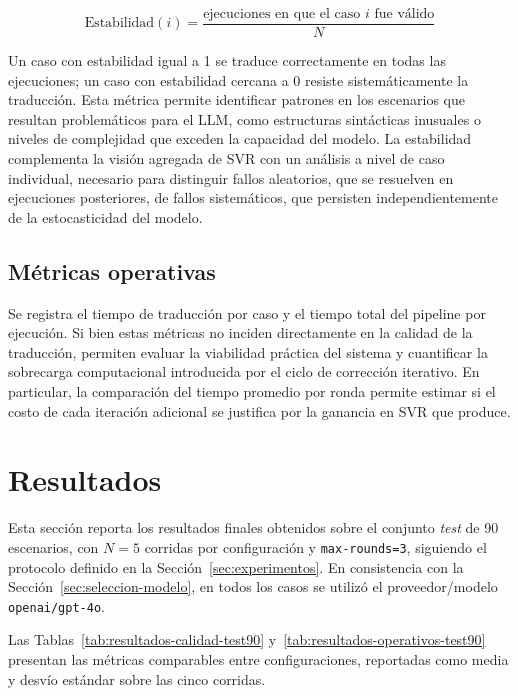 \begin{equation}
  \text{Estabilidad}(i) = \frac{\text{ejecuciones en que el caso } i \text{ fue válido}}{N}
\label{eq:estabilidad}
\end{equation}

Un caso con estabilidad igual a 1 se traduce correctamente en todas las ejecuciones; un caso con estabilidad cercana a 0 resiste sistemáticamente la traducción. Esta métrica permite identificar patrones en los escenarios que resultan problemáticos para el LLM, como estructuras sintácticas inusuales o niveles de complejidad que exceden la capacidad del modelo. La estabilidad complementa la visión agregada de SVR con un análisis a nivel de caso individual, necesario para distinguir fallos aleatorios, que se resuelven en ejecuciones posteriores, de fallos sistemáticos, que persisten independientemente de la estocasticidad del modelo.

\subsection{Métricas operativas}

Se registra el tiempo de traducción por caso y el tiempo total del pipeline por ejecución. Si bien estas métricas no inciden directamente en la calidad de la traducción, permiten evaluar la viabilidad práctica del sistema y cuantificar la sobrecarga computacional introducida por el ciclo de corrección iterativo. En particular, la comparación del tiempo promedio por ronda permite estimar si el costo de cada iteración adicional se justifica por la ganancia en SVR que produce.

\section{Resultados}
\label{sec:resultados}

Esta sección reporta los resultados finales obtenidos sobre el conjunto \textit{test} de 90 escenarios, con $N=5$ corridas por configuración y \texttt{max-rounds=3}, siguiendo el protocolo definido en la Sección~\ref{sec:experimentos}. En consistencia con la Sección~\ref{sec:seleccion-modelo}, en todos los casos se utilizó el proveedor/modelo \texttt{openai/gpt-4o}.

Las Tablas~\ref{tab:resultados-calidad-test90} y~\ref{tab:resultados-operativos-test90} presentan las métricas comparables entre configuraciones, reportadas como media y desvío estándar sobre las cinco corridas.

